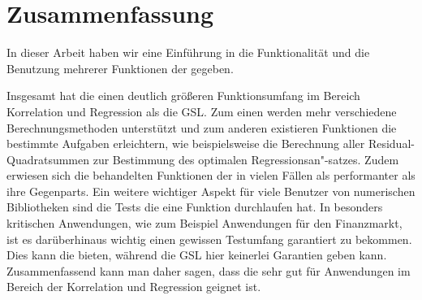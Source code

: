 \section{Zusammenfassung}

In dieser Arbeit haben wir eine Einführung in die Funktionalität und die Benutzung mehrerer Funktionen der \naglib gegeben.

Insgesamt hat die \naglib einen deutlich größeren Funktionsumfang im Bereich Korrelation und Regression als die GSL.
Zum einen werden mehr verschiedene Berechnungsmethoden unterstützt und zum anderen existieren Funktionen die bestimmte Aufgaben erleichtern, wie beispielsweise die Berechnung aller Residual-Quadratsummen zur Bestimmung des optimalen Regressionsan"-satzes.
Zudem erwiesen sich die behandelten Funktionen der \naglib in vielen Fällen als performanter als ihre Gegenparts.
Ein weitere wichtiger Aspekt für viele Benutzer von numerischen Bibliotheken sind die Tests die eine Funktion durchlaufen hat.
In besonders kritischen Anwendungen, wie zum Beispiel Anwendungen für den Finanzmarkt, ist es darüberhinaus wichtig einen gewissen Testumfang garantiert zu bekommen.
Dies kann die \naglib bieten, während die GSL hier keinerlei Garantien geben kann. 
Zusammenfassend kann man daher sagen, dass die \naglib sehr gut für Anwendungen im Bereich der Korrelation und Regression geignet ist.



